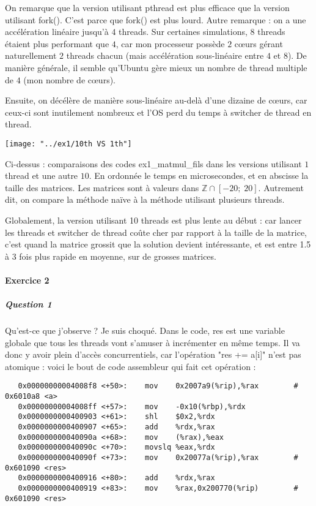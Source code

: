 \documentclass{article}
\newcommand\code[1]{{\fontfamily{lmtt}\selectfont #1}}
\begin{document}
	\newpage
	On remarque que la version utilisant \code{pthread} est plus efficace que la version utilisant \code{fork()}. C'est parce que \code{fork()} est plus lourd. Autre remarque : on a une accélération linéaire jusqu'à $4$ threads. Sur certaines simulations, $8$ threads étaient plus performant que $4$, car mon processeur possède $2$ cœurs gérant naturellement $2$ threads chacun (mais accélération sous-linéaire entre $4$ et $8$). De manière générale, il semble qu'Ubuntu gère mieux un nombre de thread multiple de $4$ (mon nombre de cœurs).
	
	Ensuite, on décélère de manière sous-linéaire au-delà d'une dizaine de cœurs, car ceux-ci sont inutilement nombreux et l'OS perd du temps à switcher de thread en thread.
	
	
	
		\begin{center}
		\texttt{[image: "../ex1/10th VS 1th"]}
		\end{center}
	
	Ci-dessus : comparaisons des codes \code{ex1\_matmul\_fils} dans les versions utilisant $1$ thread et une autre $10$. En ordonnée le temps en microsecondes, et en abscisse la taille des matrices. Les matrices sont à valeurs dans $\mathbb{Z} \cap [-20;\;20]$. Autrement dit, on compare la méthode naïve à la méthode utilisant plusieurs threads.
	
	\vspace{0.5cm}
	Globalement, la version utilisant 10 threads est plus lente au début : car lancer les threads et switcher de thread coûte cher par rapport à la taille de la matrice, c'est quand la matrice grossit que la solution devient intéressante, et est entre 1.5 à 3 fois plus rapide en moyenne, sur de grosses matrices.
	
\newpage
\paragraph{Exercice 2}

	\subparagraph{Question 1}
	
		Qu'est-ce que j'observe ? Je suis choqué. Dans le code, \code{res} est une variable globale que tous les threads vont s'amuser à incrémenter en même temps. Il va donc y avoir plein d'accès concurrentiels, car l'opération "\code{res += a[i]}"	n'est pas atomique : voici le bout de code assembleur qui fait cet opération :
		
		\begin{scriptsize}
		\begin{lstlisting}
   0x00000000004008f8 <+50>:	mov    0x2007a9(%rip),%rax        # 0x6010a8 <a>
   0x00000000004008ff <+57>:	mov    -0x10(%rbp),%rdx
   0x0000000000400903 <+61>:	shl    $0x2,%rdx
   0x0000000000400907 <+65>:	add    %rdx,%rax
   0x000000000040090a <+68>:	mov    (%rax),%eax
   0x000000000040090c <+70>:	movslq %eax,%rdx
   0x000000000040090f <+73>:	mov    0x20077a(%rip),%rax        # 0x601090 <res>
   0x0000000000400916 <+80>:	add    %rdx,%rax
   0x0000000000400919 <+83>:	mov    %rax,0x200770(%rip)        # 0x601090 <res>
		\end{lstlisting}
		\end{scriptsize}
	
\end{document}
